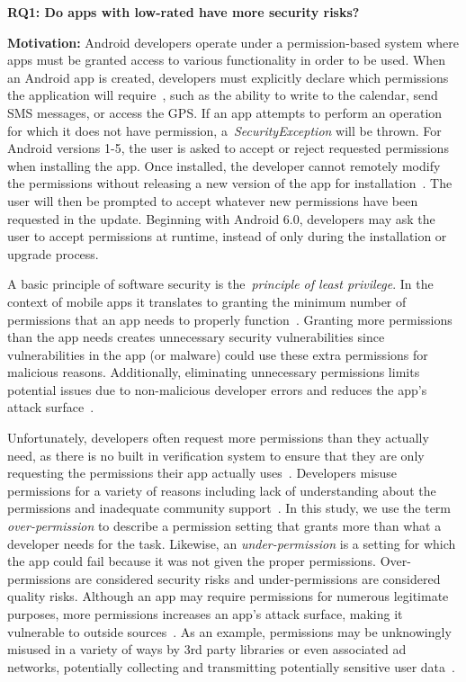 \documentclass{sig-alternate-05-2015}
\begin{document}
\textbf{RQ1: Do apps with low-rated have more security risks?}

\textbf{Motivation:} Android developers operate under a permission-based system where apps must be granted access to various functionality in order to be used. When an Android app is created, developers must explicitly declare which permissions the application will require~\cite{Felt:2011:APD:2046707.2046779}, such as the ability to write to the calendar, send SMS messages, or access the GPS. If an app attempts to perform an operation for which it does not have permission, a~\emph{SecurityException} will be thrown. For Android versions 1-5, the user is asked to accept or reject requested permissions when installing the app. Once installed, the developer cannot remotely modify the permissions without releasing a new version of the app for installation~\cite{shaerpour2013trends}. The user will then be prompted to accept whatever new permissions have been requested in the update. Beginning with Android 6.0, developers may ask the user to accept permissions at runtime, instead of only during the installation or upgrade process.

A basic principle of software security is the~\emph{principle of least privilege}. In the context of mobile apps it translates to granting the minimum number of permissions that an app needs to properly function~\cite{saltzer1975protection}. Granting more permissions than the app needs creates unnecessary security vulnerabilities since vulnerabilities in the app (or malware) could use these extra permissions for malicious reasons. Additionally, eliminating unnecessary permissions limits potential issues due to non-malicious developer errors and reduces the app's attack surface~\cite{5482589}.

Unfortunately, developers often request more permissions than they actually need, as there is no built in verification system to ensure that they are only requesting the permissions their app actually uses~\cite{Felt:2011:APD:2046707.2046779}. Developers misuse permissions for a variety of reasons including lack of understanding about the permissions and inadequate community support~\cite{Stevens:2013:APU:2487085.2487093}. In this study, we use the term \emph{over-permission} to describe a permission setting that grants more than what a developer needs for the task. Likewise, an \emph{under-permission} is a setting for which the app could fail because it was not given the proper permissions. Over-permissions are considered security risks and under-permissions are considered quality risks. Although an app may require permissions for numerous legitimate purposes, more permissions increases an app's attack surface, making it vulnerable to outside sources~\cite{5482589, Felt:2011:APD:2046707.2046779}. As an example, permissions may be unknowingly misused in a variety of ways by 3rd party libraries or even  associated ad networks, potentially collecting and transmitting potentially sensitive user data~\cite{Grace:2012:UEA:2185448.2185464,7371575}.
\end{document}
